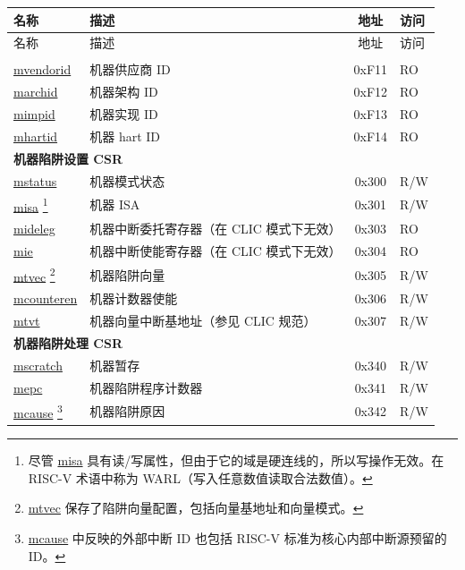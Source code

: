 
\begin{longtable}{ | p{4.0cm} | p{8.4cm} | c | l | }
\hline\rowcolor{lightgray}
名称 & 描述 & 地址 & 访问 \\ \hline
\endfirsthead
\hline
\rowcolor{lightgray}
名称 & 描述 & 地址 & 访问 \\
\hline
\endhead
\endfoot

\multicolumn{4}{|l|}{\textbf{机器信息 CSR}} \\\hline
\hyperref[regdesc:MVENDORID]{mvendorid} & 机器供应商 ID & 0xF11 & RO \\\hline
\hyperref[regdesc:MARCHID]{marchid} & 机器架构 ID & 0xF12 & RO \\\hline
\hyperref[regdesc:MIMPID]{mimpid} & 机器实现 ID & 0xF13 & RO \\\hline
\hyperref[regdesc:MHARTID]{mhartid} & 机器 hart ID & 0xF14 & RO \\\hline
\multicolumn{4}{|l|}{\textbf{机器陷阱设置 CSR}} \\\hline
\hyperref[regdesc:MSTATUS]{mstatus} & 机器模式状态 & 0x300 & R/W \\\hline
\hyperref[regdesc:MISA]{misa} \footnote{尽管 \hyperref[regdesc:MISA]{misa} 具有读/写属性，但由于它的域是硬连线的，所以写操作无效。在 RISC-V 术语中称为 WARL（写入任意数值读取合法数值）。} & 机器 ISA & 0x301 & R/W \\\hline
\hyperref[regdesc:MIDELEG_REG]{mideleg} & 机器中断委托寄存器（在 CLIC 模式下无效） & 0x303 & RO \\\hline
\hyperref[regdesc:MIE_REG]{mie} & 机器中断使能寄存器（在 CLIC 模式下无效） & 0x304 & RO \\\hline
\hyperref[regdesc:MTVEC]{mtvec} \footnote{\hyperref[regdesc:MTVEC]{mtvec} 保存了陷阱向量配置，包括向量基地址和向量模式。} & 机器陷阱向量 & 0x305 & R/W \\\hline
\hyperref[regdesc:MCOUNTEREN]{mcounteren} & 机器计数器使能 & 0x306 & R/W \\\hline
\hyperref[regdesc:MTVT]{mtvt} & 机器向量中断基地址（参见 CLIC 规范） & 0x307 & R/W \\\hline
\multicolumn{4}{|l|}{\textbf{机器陷阱处理 CSR}} \\\hline
\hyperref[regdesc:MSCRATCH]{mscratch} & 机器暂存 & 0x340 & R/W \\\hline
\hyperref[regdesc:MEPC]{mepc} & 机器陷阱程序计数器 & 0x341 & R/W \\\hline
\hyperref[regdesc:MCAUSE]{mcause} \footnote{\hyperref[regdesc:MCAUSE]{mcause} 中反映的外部中断 ID 也包括 RISC-V 标准为核心内部中断源预留的 ID。} & 机器陷阱原因 & 0x342 & R/W \\\hline

\end{longtable}
